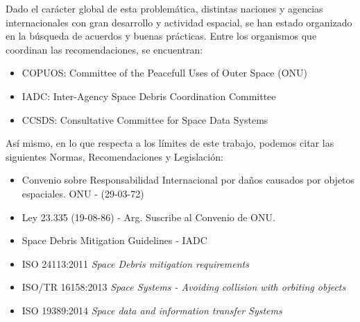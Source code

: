 Dado el car\'acter global de esta problem\'atica, distintas naciones y agencias internacionales con gran desarrollo y actividad espacial, se han estado organizado en la b\'usqueda de acuerdos y buenas pr\'acticas. Entre los organismos que coordinan las recomendaciones, se encuentran:\\

\begin{itemize}
\item {\small{COPUOS: Committee of the Peacefull Uses of Outer Space (ONU)}}
\item {\small{IADC: Inter-Agency Space Debris Coordination Committee}}
\item {\small{CCSDS: Consultative Committee for Space Data Systems}}
\end{itemize}

As\'i mismo, en lo que respecta a los l\'imites de este trabajo, podemos citar las siguientes Normas, Recomendaciones y Legislaci\'on:\\

\begin{itemize}
\item {\small{Convenio sobre Responsabilidad Internacional por da\~nos causados por objetos espaciales. ONU - (29-03-72)}}
\item {\small{Ley 23.335 (19-08-86) - Arg. Suscribe al Convenio de ONU.}}
\item {\small{Space Debris Mitigation Guidelines - IADC}}
\item {\small{ISO 24113:2011 {\it{Space Debris mitigation requirements}}}}
\item {\small{ISO/TR 16158:2013 {\it{Space Systems - Avoiding collision with orbiting objects}}}}
\item {\small{ISO 19389:2014 {\it{Space data and information transfer Systems}}}}

\end{itemize}


